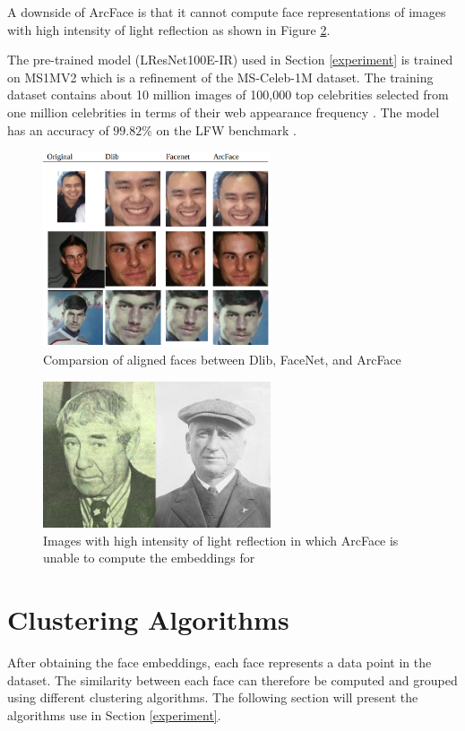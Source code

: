 \documentclass[12pt,english]{article}
\begin{document}
A downside of ArcFace is that it cannot compute face representations of images with high intensity of light reflection \cite{chinapas} as shown in Figure \ref{fig:arcface2}.

The pre-trained model (LResNet100E-IR) used in Section \ref{experiment} is trained on MS1MV2 which is a refinement of the MS-Celeb-1M dataset. The training dataset contains about 10 million images of 100,000 top celebrities selected from one million celebrities in terms of their web appearance frequency \cite{deng}. The model has an accuracy of $99.82\%$ on the LFW benchmark \cite{deng2019}.

\begin{figure}[!tbp]
 \centering
    \includegraphics[width=0.6\textwidth]{figures/comparison.png}
    \caption{Comparsion of aligned faces between Dlib, FaceNet, and ArcFace \cite{chinapas}}
	\label{fig:arcface1}
\end{figure}

\begin{figure}[!tbp]
 \centering
    \includegraphics[width=0.6\textwidth]{figures/ex.png}
    \caption{Images with high intensity of light reflection in which ArcFace is unable to compute the embeddings for \cite{chinapas}}
	\label{fig:arcface2}
\end{figure}

\section{Clustering Algorithms}
\label{clustering}
\quad
After obtaining the face embeddings, each face represents a data point in the dataset. The similarity between each face can therefore be computed and grouped using different clustering algorithms. The following section will present the algorithms use in Section \ref{experiment}. 
\end{document}
